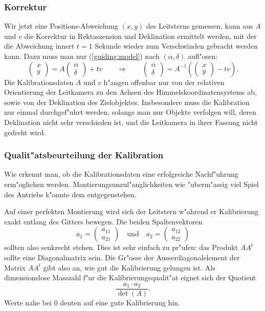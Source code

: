\subsubsection{Korrektur}
Wir jetzt eine Positions-Abweichung $(x,y)$ des Leitsterns gemessen,
kann aus $A$ und $v$ die Korrektur in Rektaszension und Deklination
ermittelt werden, mit der die Abweichung innert $t=1$ Sekunde wieder
zum Verschwinden gebracht werden kann. Dazu muss man nur
(\ref{guiding:model}) nach $(\alpha,\delta)$ aufl"osen:
\[
\begin{pmatrix}x\\y\end{pmatrix}
=
A\begin{pmatrix}\alpha\\\delta\end{pmatrix}+tv
\qquad
\Rightarrow
\qquad
\begin{pmatrix}\alpha\\\delta\end{pmatrix}=
A^{-1}\left(
\begin{pmatrix}
x\\y
\end{pmatrix}
-tv
\right).
\]
Die Kalibrationsdaten $A$ und $v$ h"angen offenbar nur von der relativen
Orientierung der Leitkamera zu den Achsen des Himmelskoordinatensystems
ab, sowie von der Deklination des Zielobjektes.
Insbesondere muss die
Kalibration nur einmal durchgef"uhrt werden, solange man nur Objekte verfolgen
will, deren Deklination nicht sehr verschieden ist, und die Leitkamera in ihrer
Fassung nicht gedreht wird.

\subsubsection{Qualit"atsbeurteilung der Kalibration}
Wie erkennt man, ob die Kalibrationsdaten eine erfolgreiche Nachf"uhrung
erm"oglichen werden. Montierungsunzul"anglichkeiten wie "uberm"assig 
viel Spiel des Antriebs k"onnte dem entgegenstehen.

Auf einer perfekten Montierung wird sich der Leitstern w"ahrend er 
Kalibrierung exakt entlang des Gitters bewegen. Die beiden Spaltenvektoren
\[
a_1=\begin{pmatrix}a_{11}\\ a_{21}\end{pmatrix}
\quad\text{und}
\quad
a_2=\begin{pmatrix}a_{12}\\ a_{22}\end{pmatrix}
\]
sollten also senkrecht stehen. Dies ist sehr einfach zu pr"ufen:
das Produkt $AA^t$ sollte eine Diagonalmatrix sein. Die Gr"osse der
Ausserdiagonalelement der Matrix $AA^t$ gibt also an, wie gut die Kalibrierung
gelungen ist.
Als dimensionslose  Masszahl f"ur die Kalibrierungsqualit"at
eignet sich der Quotient
\[
\frac{a_1\cdot a_2}{\det(A)}.
\]
Werte nahe bei $0$ deuten auf eine gute Kalibrierung hin.
